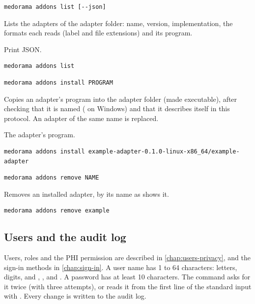 \begin{lstlisting}[style=signature]
medorama addons list [--json]
\end{lstlisting}
Lists the adapters of the adapter folder: name, version, implementation, the formats each reads
(label and file extensions) and its program.
\begin{params}
\item[--json] Print JSON.
\end{params}
\begin{lstlisting}[style=shell]
medorama addons list
\end{lstlisting}

\begin{lstlisting}[style=signature]
medorama addons install PROGRAM
\end{lstlisting}
Copies an adapter's program into the adapter folder (made executable), after checking that it is
named  ( on Windows) and that it describes itself
in this protocol. An adapter of the same name is replaced.
\begin{params}
\item[PROGRAM] The adapter's program.
\end{params}
\begin{lstlisting}[style=shell]
medorama addons install example-adapter-0.1.0-linux-x86_64/example-adapter
\end{lstlisting}

\begin{lstlisting}[style=signature]
medorama addons remove NAME
\end{lstlisting}
Removes an installed adapter, by its name as  shows it.
\begin{lstlisting}[style=shell]
medorama addons remove example
\end{lstlisting}

\subsection{Users and the audit log}
\label{sec:cli-users}

Users, roles and the PHI permission are described in \cref{chap:users-privacy}, and the
sign-in methods in \cref{chap:sign-in}. A user name has 1 to 64 characters: letters, digits, and
, \code{\_}, \code{-} and . A password has at least 10 characters. The command
asks for it twice (with three attempts), or reads it from the first line of the standard input
with . Every change is written to the audit log.

